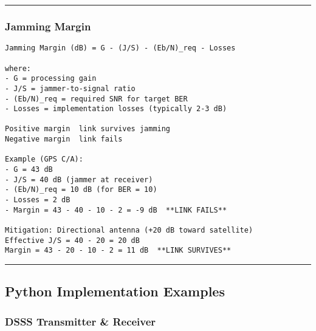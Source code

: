 \begin{center}\rule{0.5\linewidth}{0.5pt}\end{center}

\subsubsection{Jamming Margin}\label{jamming-margin}

\begin{verbatim}
Jamming Margin (dB) = G - (J/S) - (Eb/N)_req - Losses

where:
- G = processing gain
- J/S = jammer-to-signal ratio
- (Eb/N)_req = required SNR for target BER
- Losses = implementation losses (typically 2-3 dB)

Positive margin  link survives jamming
Negative margin  link fails

Example (GPS C/A):
- G = 43 dB
- J/S = 40 dB (jammer at receiver)
- (Eb/N)_req = 10 dB (for BER = 10)
- Losses = 2 dB
- Margin = 43 - 40 - 10 - 2 = -9 dB  **LINK FAILS**

Mitigation: Directional antenna (+20 dB toward satellite)
Effective J/S = 40 - 20 = 20 dB
Margin = 43 - 20 - 10 - 2 = 11 dB  **LINK SURVIVES**
\end{verbatim}

\begin{center}\rule{0.5\linewidth}{0.5pt}\end{center}

\subsection{\texorpdfstring{ Python Implementation
Examples}{ Python Implementation Examples}}\label{python-implementation-examples}

\subsubsection{DSSS Transmitter \&
Receiver}\label{dsss-transmitter-receiver}

